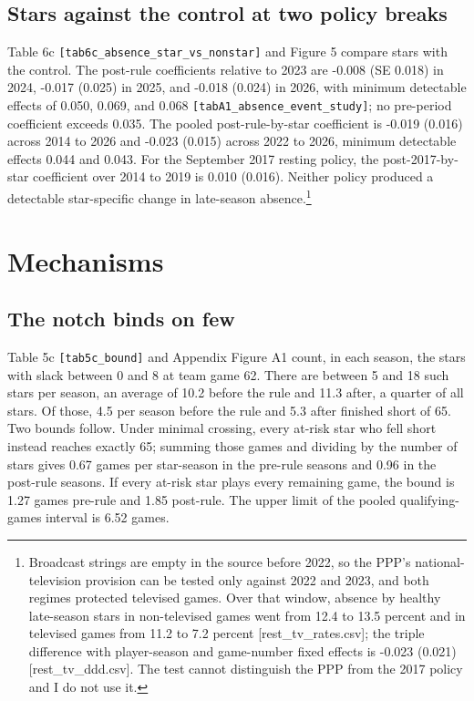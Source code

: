 \documentclass[11pt]{article}
\begin{document}
\subsection*{Stars against the control at two policy breaks}


Table 6c {\small\texttt{[tab6c\_absence\_star\_vs\_nonstar]}} and Figure 5 compare stars with the control. The post-rule coefficients relative to 2023 are -0.008 (SE 0.018) in 2024, -0.017 (0.025) in 2025, and -0.018 (0.024) in 2026, with minimum detectable effects of 0.050, 0.069, and 0.068 {\small\texttt{[tabA1\_absence\_event\_study]}}; no pre-period coefficient exceeds 0.035. The pooled post-rule-by-star coefficient is -0.019 (0.016) across 2014 to 2026 and -0.023 (0.015) across 2022 to 2026, minimum detectable effects 0.044 and 0.043. For the September 2017 resting policy, the post-2017-by-star coefficient over 2014 to 2019 is 0.010 (0.016). Neither policy produced a detectable star-specific change in late-season absence.\footnote{Broadcast strings are empty in the source before 2022, so the PPP's national-television provision can be tested only against 2022 and 2023, and both regimes protected televised games. Over that window, absence by healthy late-season stars in non-televised games went from 12.4 to 13.5 percent and in televised games from 11.2 to 7.2 percent [rest\_tv\_rates.csv]; the triple difference with player-season and game-number fixed effects is -0.023 (0.021) [rest\_tv\_ddd.csv]. The test cannot distinguish the PPP from the 2017 policy and I do not use it.}



\section{Mechanisms}



\subsection*{The notch binds on few}


Table 5c {\small\texttt{[tab5c\_bound]}} and Appendix Figure A1 count, in each season, the stars with slack between 0 and 8 at team game 62. There are between 5 and 18 such stars per season, an average of 10.2 before the rule and 11.3 after, a quarter of all stars. Of those, 4.5 per season before the rule and 5.3 after finished short of 65. Two bounds follow. Under minimal crossing, every at-risk star who fell short instead reaches exactly 65; summing those games and dividing by the number of stars gives 0.67 games per star-season in the pre-rule seasons and 0.96 in the post-rule seasons. If every at-risk star plays every remaining game, the bound is 1.27 games pre-rule and 1.85 post-rule. The upper limit of the pooled qualifying-games interval is 6.52 games.
\end{document}
